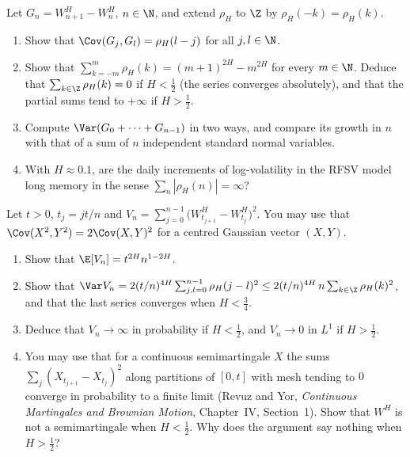 
\begin{exercise}\label{ex:rv-fgn}
\easy Let $G_n=W^H_{n+1}-W^H_n$, $n\in\N$, and extend $\rho_H$ to $\Z$ by $\rho_H(-k)=\rho_H(k)$.
\begin{enumerate}[label=(\alph*)]
  \item Show that $\Cov(G_j,G_l)=\rho_H(l-j)$ for all $j,l\in\N$.
  \item Show that $\sum_{k=-m}^m\rho_H(k)=(m+1)^{2H}-m^{2H}$ for every $m\in\N$. Deduce that
    $\sum_{k\in\Z}\rho_H(k)=0$ if $H<\frac12$ (the series converges absolutely), and that the partial sums tend to
    $+\infty$ if $H>\frac12$.
  \item Compute $\Var(G_0+\dots+G_{n-1})$ in two ways, and compare its growth in $n$ with that of a sum of
    $n$ independent standard normal variables.
  \item With $H\approx0.1$, are the daily increments of log-volatility in the RFSV model long memory in the sense
    $\sum_n|\rho_H(n)|=\infty$?
\end{enumerate}
\end{exercise}

\begin{exercise}\label{ex:rv-qv}
\medium Let $t>0$, $t_j=jt/n$ and $V_n=\sum_{j=0}^{n-1}\big(W^H_{t_{j+1}}-W^H_{t_j}\big)^2$. You may use that
$\Cov(X^2,Y^2)=2\Cov(X,Y)^2$ for a centred Gaussian vector $(X,Y)$.
\begin{enumerate}[label=(\alph*)]
  \item Show that $\E[V_n]=t^{2H}n^{1-2H}$.
  \item Show that $\Var V_n=2(t/n)^{4H}\sum_{j,l=0}^{n-1}\rho_H(j-l)^2\le2(t/n)^{4H}\,n\sum_{k\in\Z}\rho_H(k)^2$, and that
    the last series converges when $H<\frac34$.
  \item Deduce that $V_n\to\infty$ in probability if $H<\frac12$, and $V_n\to0$ in $L^1$ if $H>\frac12$.
  \item You may use that for a continuous semimartingale $X$ the sums $\sum_j(X_{t_{j+1}}-X_{t_j})^2$ along
    partitions of $[0,t]$ with mesh tending to $0$ converge in probability to a finite limit (Revuz and Yor,
    \emph{Continuous Martingales and Brownian Motion}, Chapter~IV, Section~1). Show that $W^H$ is not a
    semimartingale when $H<\frac12$. Why does the argument say nothing when $H>\frac12$?
\end{enumerate}
\end{exercise}


